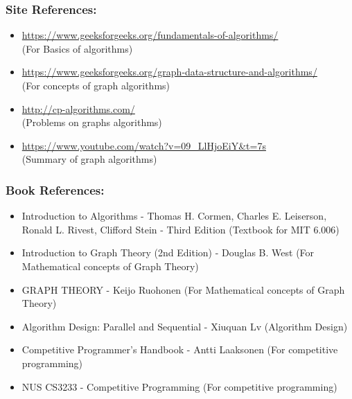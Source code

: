 \subsubsection*{Site References:}
\vspace{-2mm}
\begin{itemize}[itemsep = -1 mm]
  \item \url{https://www.geeksforgeeks.org/fundamentals-of-algorithms/}\\(For Basics of algorithms)
  \item \url{https://www.geeksforgeeks.org/graph-data-structure-and-algorithms/}\\(For concepts of graph algorithms)
  \item \url{http://cp-algorithms.com/}\\(Problems on graphs algorithms)
  \item \url{https://www.youtube.com/watch?v=09_LlHjoEiY&t=7s}\\(Summary of graph algorithms)
\end{itemize}

\subsubsection*{Book References:}
\vspace{-2mm}
\begin{itemize}[itemsep = 0 mm]
  \item Introduction to Algorithms - Thomas H. Cormen, Charles E. Leiserson, Ronald L. Rivest, Clifford Stein - Third Edition (Textbook for MIT 6.006)
  \item Introduction to Graph Theory (2nd Edition) - Douglas B. West (For Mathematical concepts of Graph Theory)
  \item GRAPH THEORY - Keijo Ruohonen (For Mathematical concepts of Graph Theory)
  \item Algorithm Design: Parallel and Sequential - Xiuquan Lv (Algorithm Design)
  \item Competitive Programmer’s Handbook - Antti Laaksonen (For competitive programming)
  \item NUS CS3233 - Competitive Programming (For competitive programming)
\end{itemize}

